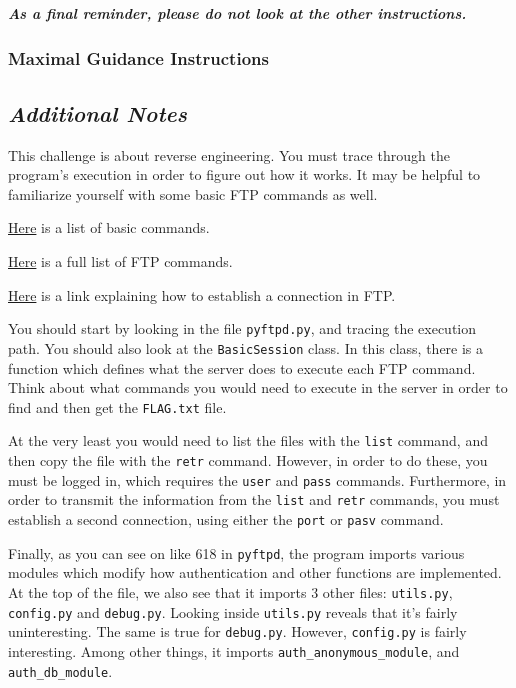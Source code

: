 {{{                    \textbf{\textit{As a final reminder, please do not look at the other instructions.}}
            }
        \newpage
        \subsubsection{Maximal Guidance Instructions}
            {\parindent0pt\singlespacing
                \subsection*{\textit{Additional Notes}}
                    This challenge is about reverse engineering. %
You must trace through the program's execution in order to figure out how it works. %
It may be helpful to familiarize yourself with some basic FTP commands as well. 

                    \href{https://kb.iu.edu/d/aenq}{Here} is a list of basic commands.

                    \href{https://en.wikipedia.org/wiki/List_of_FTP_commands}{Here} is a full list of FTP commands.

                    \href{https://www.serv-u.com/resource/tutorial/pasv-response-epsv-port-pbsz-rein-ftp-command#fac52a38-7ddb-4815-a9dc-72cc03c0a8e6}{Here} is a link explaining how to establish a connection in FTP.

                    You should start by looking in the file \lstinline`pyftpd.py`, and tracing the execution path. %
You should also look at the \lstinline`BasicSession` class. %
In this class, there is a function which defines what the server does to execute each FTP command. %
Think about what commands you would need to execute in the server in order to find and then get the \lstinline`FLAG.txt` file. 

                    At the very least you would need to list the files with the \lstinline`list` command, and then copy the file with the \lstinline`retr` command. %
However, in order to do these, you must be logged in, which requires the \lstinline`user` and \lstinline`pass` commands. %
Furthermore, in order to transmit the information from the \lstinline`list` and \lstinline`retr` commands, you must establish a second connection, using either the \lstinline`port` or \lstinline`pasv` command. 

                    Finally, as you can see on like 618 in \lstinline`pyftpd`, the program imports various modules which modify how authentication and other functions are implemented. %
At the top of the file, we also see that it imports 3 other files: \lstinline`utils.py`, \lstinline`config.py` and \lstinline`debug.py`. %
Looking inside \lstinline`utils.py` reveals that it's fairly uninteresting. %
The same is true for \lstinline`debug.py`. %
However, \lstinline`config.py` is fairly interesting. %
Among other things, it imports \lstinline`auth_anonymous_module`, and \lstinline`auth_db_module`. 

}}}

